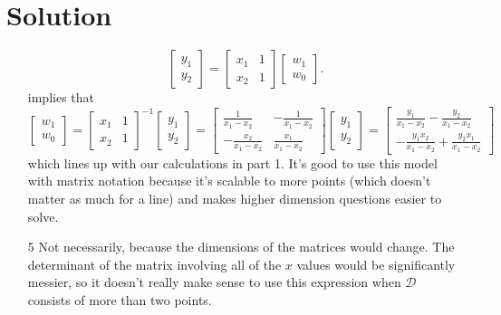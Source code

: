 \documentclass{../harvardml}
\theoremstyle{definition}
\theoremstyle{plain}
\newenvironment{solution}
  {\color{blue}\section*{Solution}}
{}
\begin{document}
\begin{solution}
\begin{itemize}
$$\begin{bmatrix}
            y_1 \\
            y_2
        \end{bmatrix}
        =
        \begin{bmatrix}
            x_1 & 1 \\
            x_2 & 1
        \end{bmatrix}
        \begin{bmatrix}
            w_1 \\
            w_0
        \end{bmatrix}.
        $$
        implies that 
        $$\begin{bmatrix}
            w_1 \\
            w_0
        \end{bmatrix} = 
        \begin{bmatrix}
            x_1 & 1 \\
            x_2 & 1
        \end{bmatrix}^{-1}
        \begin{bmatrix}
            y_1 \\
            y_2
        \end{bmatrix} 
        = 
        \begin{bmatrix}
            \frac{1}{x_1 - x_2} & -\frac{1}{x_1 - x_2} \\
            -\frac{x_2}{x_1 - x_2} & \frac{x_1}{x_1 - x_2}
        \end{bmatrix}
        \begin{bmatrix}
            y_1 \\
            y_2
        \end{bmatrix} 
        =
        \begin{bmatrix}
            \frac{y_1}{x_1 - x_2} - \frac{y_2}{x_1 - x_2} \\
            -\frac{y_1x_2}{x_1 - x_2} + \frac{y_2x_1}{x_1 - x_2}
        \end{bmatrix}
        $$
        which lines up with our calculations in part 1. It's good to use this model with matrix notation because it's scalable to more points (which doesn't matter as much for a line) and makes higher dimension questions easier to solve. 
        \item[5] Not necessarily, because the dimensions of the matrices would change. The determinant of the matrix involving all of the $x$ values would be significantly messier, so it doesn't really make sense to use this expression when $\mathcal{D}$ consists of more than two points.
     \end{itemize}
    
\end{solution}
\end{document}
